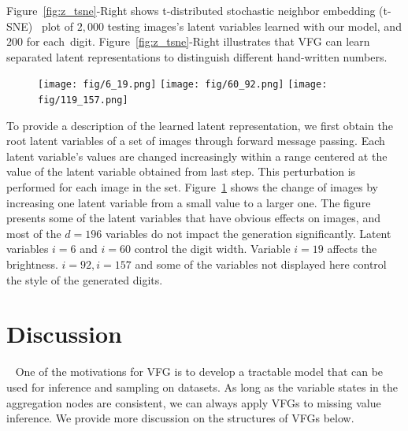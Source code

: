 \documentclass[sigconf, anonymous, review]{acmart}
\theoremstyle{plain}
\theoremstyle{definition}
\theoremstyle{remark}
\begin{document}
Figure~\ref{fig:z_tsne}-Right shows  t-distributed stochastic neighbor embedding (t-SNE)~\cite{maaten2008visualizing} plot of $2,000$ testing images's latent variables learned with our model, and $200$ for each~digit. 
Figure~\ref{fig:z_tsne}-Right illustrates that VFG can learn separated latent representations to distinguish different hand-written numbers.

\begin{figure}[h!]
\begin{center}
 \texttt{[image: fig/6\_19.png]}
  \texttt{[image: fig/60\_92.png]} 
    \texttt{[image: fig/119\_157.png]} 
\end{center}
\vspace{-0.1in}
\label{fig:mnist_dis}\vspace{-0.1in}
\end{figure}

To provide a description of the learned latent representation, we first obtain the root latent variables of a set of images through forward message passing. Each latent variable's values are changed increasingly within a range centered at the value of the latent variable obtained from last step. 
This perturbation is performed for each image in the set.
Figure~\ref{fig:mnist_dis} shows the change of images by increasing one latent variable from a small value to a larger one. The figure presents some of the latent variables that have obvious effects on images, and most of the $d=196$ variables do not impact the generation significantly. Latent variables $i=6$ and $i=60$ control the digit width. Variable $i=19$ affects the brightness.  $i=92, i=157$ and some of the variables not displayed here control the style of the generated digits. 



\section{Discussion}~\label{sec:discuss}
One of the motivations for VFG is to develop a tractable model that can be used for inference and sampling on datasets.
As long as the variable states in the aggregation nodes are consistent, we can always apply VFGs to missing value inference. We provide more discussion on the structures of VFGs below.
\vspace{-0.05in}
\end{document}
